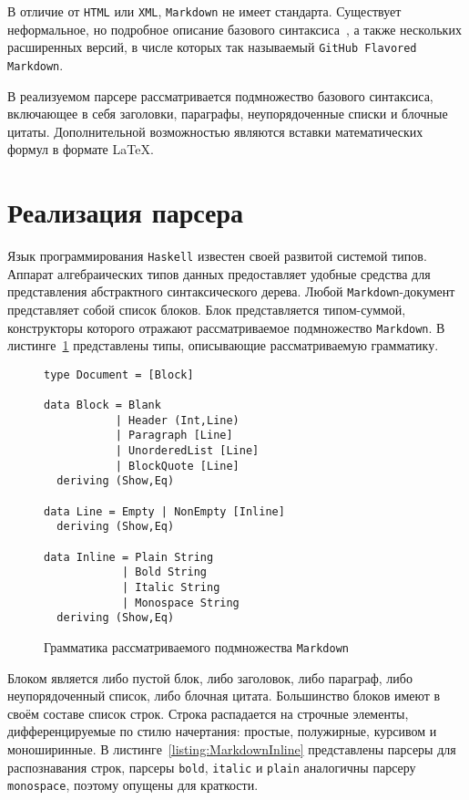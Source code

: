 В отличие от \lstinline{HTML} или \lstinline{XML}, \lstinline{Markdown} не имеет
стандарта. Существует неформальное, но подробное описание базового
синтаксиса~\cite{markdownSyntax}, а также нескольких расширенных версий, в
числе которых так называемый \lstinline{GitHub Flavored Markdown}.

В реализуемом парсере рассматривается подмножество базового синтаксиса,
включающее в себя заголовки, параграфы, неупорядоченные списки и блочные цитаты.
Дополнительной возможностью являются вставки математических формул в формате
\LaTeX.

\section{Реализация парсера}

Язык программирования \lstinline{Haskell} известен своей развитой системой
типов. Аппарат алгебраических типов данных предоставляет удобные средства для
представления абстрактного синтаксического дерева. Любой 
\lstinline{Markdown}-документ представляет собой список блоков. Блок
представляется типом-суммой, конструкторы которого отражают рассматриваемое
подмножество \lstinline{Markdown}. В листинге~\ref{listing:MarkdownADT}
представлены типы, описывающие рассматриваемую грамматику.

\begin{figure}[t]
\begin{lstlisting}
type Document = [Block]

data Block = Blank
           | Header (Int,Line)
           | Paragraph [Line]
           | UnorderedList [Line]
           | BlockQuote [Line]
  deriving (Show,Eq)

data Line = Empty | NonEmpty [Inline]
  deriving (Show,Eq)

data Inline = Plain String
            | Bold String
            | Italic String
            | Monospace String
  deriving (Show,Eq)
\end{lstlisting}
\caption{Грамматика рассматриваемого подмножества \lstinline{Markdown}}
\label{listing:MarkdownADT}
\end{figure}

Блоком является либо пустой блок, либо заголовок, либо параграф, либо
неупорядоченный список, либо блочная цитата. Большинство блоков имеют в своём
составе список строк. Строка распадается на строчные элементы, дифференцируемые
по стилю начертания: простые, полужирные, курсивом и моноширинные.
В листинге~\ref{listing:MarkdownInline} представлены парсеры для распознавания
строк, парсеры \lstinline{bold}, \lstinline{italic} и \lstinline{plain}
аналогичны парсеру \lstinline{monospace}, поэтому опущены для краткости.

